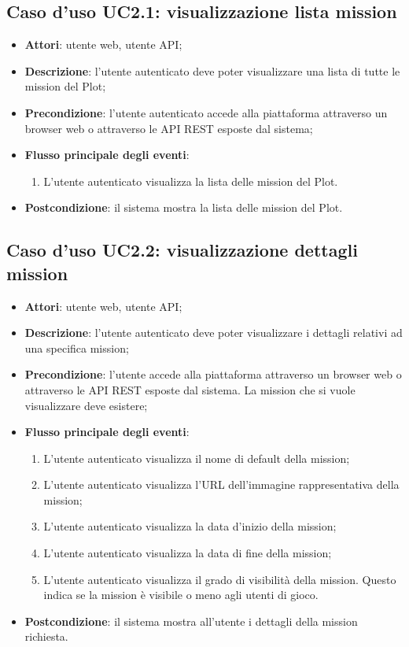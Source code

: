\subsection{Caso d'uso UC2.1: visualizzazione lista mission}
\begin{itemize}
\item \textbf{Attori}: utente web, utente API;
\item \textbf{Descrizione}: l'utente autenticato deve poter visualizzare una lista di tutte le mission del Plot; 
      \item \textbf{Precondizione}: l'utente autenticato accede alla piattaforma attraverso un browser web o attraverso le API REST esposte dal sistema;

        \item \textbf{Flusso principale degli eventi}:
          \begin{enumerate}
          \item L'utente autenticato visualizza la lista delle mission del Plot.

      \end{enumerate}
    \item \textbf{Postcondizione}: il sistema mostra la lista delle mission del Plot.
  \end{itemize}
\hypertarget{UC2.2}{}
\subsection{Caso d'uso UC2.2: visualizzazione dettagli mission}
\begin{itemize}
\item \textbf{Attori}: utente web, utente API;
\item \textbf{Descrizione}: l'utente autenticato deve poter visualizzare i dettagli relativi ad una specifica mission; 
      \item \textbf{Precondizione}: l'utente accede alla piattaforma attraverso un browser web o attraverso le API REST esposte dal sistema. La mission che si vuole visualizzare deve esistere;

        \item \textbf{Flusso principale degli eventi}:
          \begin{enumerate}
          \item L'utente autenticato visualizza il nome di default della mission;
          \item L'utente autenticato visualizza l'URL dell'immagine rappresentativa della mission;
          \item L'utente autenticato visualizza la data d'inizio della mission;
          \item L'utente autenticato visualizza la data di fine della mission;
          \item L'utente autenticato visualizza il grado di visibilità della mission. Questo indica se la mission è visibile o meno agli utenti di gioco.

      \end{enumerate}
    \item \textbf{Postcondizione}: il sistema mostra all'utente i dettagli della mission richiesta.
  \end{itemize}
\hypertarget{UC2.3}{}

